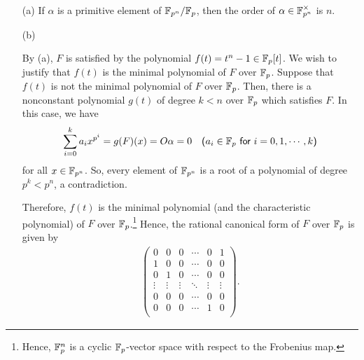 \begin{sol}
    \begin{enumerate}
        \item[(a)]
        {
            If $\alpha$ is a primitive element of ${\mathbb{F}}_{p^n}/{\mathbb{F}}_p$, then the order of $\alpha\in{\mathbb{F}}_{p^n}^\times$ is $n$.
        }
        \item[(b)]
        {
            By (a), $F$ is satisfied by the polynomial $f(t)=t^n-1\in{\mathbb{F}}_p[t]$.
            We wish to justify that $f(t)$ is the minimal polynomial of $F$ over ${\mathbb{F}}_p$.
            Suppose that $f(t)$ is not the minimal polynomial of $F$ over ${\mathbb{F}}_p$.
            Then, there is a nonconstant polynomial $g(t)$ of degree $k<n$ over ${\mathbb{F}}_p$ which satisfies $F$.
            In this case, we have
            \begin{align*}
                \sum_{i=0}^k a_ix^{p^i}=g(F)(x)=O\alpha=0\quad\textsf{($a_i\in{\mathbb{F}}_p$ for $i=0, 1, \cdots, k$)}
            \end{align*}
            for all $x\in{\mathbb{F}}_{p^n}$.
            So, every element of ${\mathbb{F}}_{p^n}$ is a root of a polynomial of degree $p^k<p^n$, a contradiction.

            Therefore, $f(t)$ is the minimal polynomial (and the characteristic polynomial) of $F$ over ${\mathbb{F}}_p$.\footnote{Hence, ${\mathbb{F}}_p^n$ is a cyclic ${\mathbb{F}}_p$-vector space with respect to the Frobenius map.}
            Hence, the rational canonical form of $F$ over ${\mathbb{F}}_p$ is given by
            \begin{align*}
                \left(\begin{array}{ccccc|c}
                        0   &   0   &   0   &   \cdots  &   0   &   1   \\\hline
                        1   &   0   &   0   &   \cdots  &   0   &   0   \\
                        0   &   1   &   0   &   \cdots  &   0   &   0   \\
                    \vdots  &\vdots &\vdots &   \ddots  &\vdots & \vdots\\
                        0   &   0   &   0   &   \cdots  &   0   &   0   \\
                        0   &   0   &   0   &   \cdots  &   1   &   0   \\
                \end{array}\right).
            \end{align*}

}
\end{enumerate}
\end{sol}

